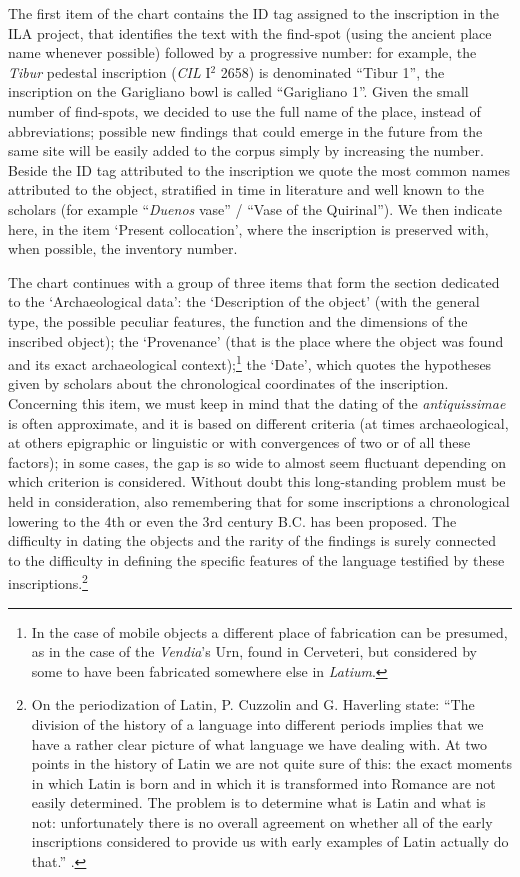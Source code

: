 \documentclass[amsthm,ebook]{saparticle}
\begin{document}
The first item of the chart contains the ID tag assigned to the inscription in the ILA project, that identifies the text
with the find-spot (using the ancient place name whenever possible) followed by a progressive number: for example, the
\emph{Tibur} pedestal inscription (\emph{CIL} I$^2$ 2658) is denominated ``Tibur 1'', the inscription on the Garigliano bowl is called
``Garigliano 1''. Given the small number of find-spots, we decided to use the full name of the place, instead of
abbreviations; possible new findings that could emerge in the future from the same site will be easily added to the
corpus simply by increasing the number. Beside the ID tag attributed to the inscription we quote the most common names
attributed to the object, stratified in time in literature and well known to the scholars (for example ``\emph{Duenos} vase'' /
``Vase of the Quirinal''). We then indicate here, in the item `Present collocation', where the inscription is
preserved with, when possible, the inventory number.

The chart continues with a group of three items that form the section dedicated to the `Archaeological data': the
‘Description of the object' (with the general type, the possible peculiar features, the function and the dimensions of
the inscribed object); the ‘Provenance' (that is the place where the object was found and its exact archaeological
context);\footnote{In the case of mobile objects a different place of fabrication can be presumed, as in the case of the
\emph{Vendia}'s Urn, found in Cerveteri, but considered by some to have been fabricated somewhere else in \emph{Latium}.} the
‘Date', which quotes the hypotheses given by scholars about the chronological coordinates of the inscription.
Concerning this item, we must keep in mind that the dating of the \emph{antiquissimae} is often approximate, and it is based
on different criteria (at times archaeological, at others epigraphic or linguistic or with convergences of two or of
all these factors); in some cases, the gap is so wide to almost seem fluctuant depending on which criterion is
considered. Without doubt this long-standing problem must be held in consideration, also remembering that for some
inscriptions a chronological lowering to the 4th or even the 3rd century B.C. has been proposed. The difficulty in
dating the objects and the rarity of the findings is surely connected to the difficulty in defining the specific
features of the language testified by these inscriptions.\footnote{On the periodization of Latin, P. Cuzzolin and G.
Haverling state: ``The division of the history of a language into different periods implies that we have a rather clear
picture of what language we have dealing with. At two points in the history of Latin we are not quite sure of this: the
exact moments in which Latin is born and in which it is transformed into Romance are not easily determined. The problem
is to determine what is Latin and what is not: unfortunately there is no overall agreement on whether all of the early
inscriptions considered to provide us with early examples of Latin actually do that.'' \citep[20]{cuzzolin_syntax_2009}.}
\end{document}
